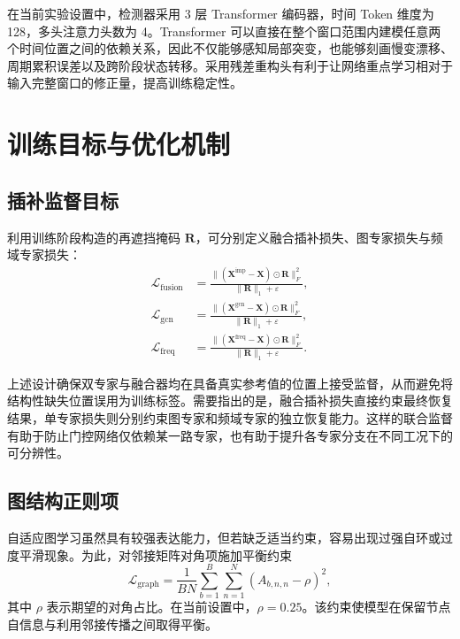 \documentclass[bachelor, vlined]{DissertUESTC}
\begin{document}
    在当前实验设置中，检测器采用 3 层 Transformer 编码器，时间 Token 维度为 128，多头注意力头数为 4。Transformer 可以直接在整个窗口范围内建模任意两个时间位置之间的依赖关系，因此不仅能够感知局部突变，也能够刻画慢变漂移、周期累积误差以及跨阶段状态转移。采用残差重构头有利于让网络重点学习相对于输入完整窗口的修正量，提高训练稳定性。
    
    \section{训练目标与优化机制}
    
    \subsection{插补监督目标}
    
    利用训练阶段构造的再遮挡掩码 $\mathbf{R}$，可分别定义融合插补损失、图专家损失与频域专家损失：
    \begin{align}
        \mathcal{L}_{\mathrm{fusion}}
        &=
        \frac{\|(\mathbf{X}^{\mathrm{imp}}-\mathbf{X}) \odot \mathbf{R}\|_F^2}{\|\mathbf{R}\|_1 + \varepsilon}, \\
        \mathcal{L}_{\mathrm{gcn}}
        &=
        \frac{\|(\mathbf{X}^{\mathrm{gcn}}-\mathbf{X}) \odot \mathbf{R}\|_F^2}{\|\mathbf{R}\|_1 + \varepsilon}, \\
        \mathcal{L}_{\mathrm{freq}}
        &=
        \frac{\|(\mathbf{X}^{\mathrm{freq}}-\mathbf{X}) \odot \mathbf{R}\|_F^2}{\|\mathbf{R}\|_1 + \varepsilon}.
    \end{align}
    
    上述设计确保双专家与融合器均在具备真实参考值的位置上接受监督，从而避免将结构性缺失位置误用为训练标签。需要指出的是，融合插补损失直接约束最终恢复结果，单专家损失则分别约束图专家和频域专家的独立恢复能力。这样的联合监督有助于防止门控网络仅依赖某一路专家，也有助于提升各专家分支在不同工况下的可分辨性。
    
    \subsection{图结构正则项}
    
    自适应图学习虽然具有较强表达能力，但若缺乏适当约束，容易出现过强自环或过度平滑现象。为此，对邻接矩阵对角项施加平衡约束
    \begin{equation}
        \mathcal{L}_{\mathrm{graph}}
        =
        \frac{1}{BN}
        \sum_{b=1}^{B}\sum_{n=1}^{N}
        \left(
            A_{b,n,n} - \rho
        \right)^2,
    \end{equation}
    其中 $\rho$ 表示期望的对角占比。在当前设置中，$\rho=0.25$。该约束使模型在保留节点自信息与利用邻接传播之间取得平衡。
    
\end{document}
